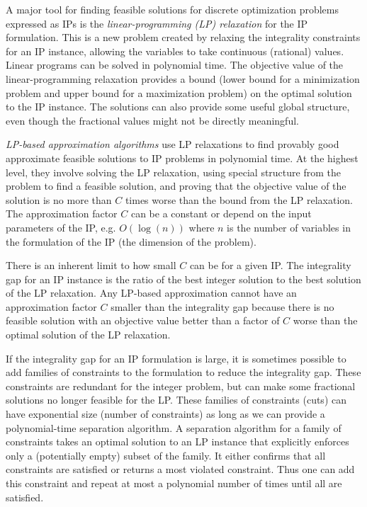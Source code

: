 \iffalse
However, there is substantial research into finding a feasible, provably-good approximate, and even (computationally) provably optimal solutions to specific IP instances. 
There is substantial research into finding a feasible, provably-good approximate solution for TODO, and even (computationally) provably optimal solutions to specific IP instances. \cindy{TODO: probably need to informally distinguish between a IP for a general problem, and a specific instance when the parameters are set.}
\fi

A major tool for finding feasible solutions for discrete optimization problems expressed as IPs is the {\em linear-programming (LP) relaxation} for the IP formulation. This is a new problem created by relaxing the integrality constraints for an IP instance, allowing the variables to take continuous (rational) values. Linear programs can be solved in polynomial time. The objective value of the linear-programming relaxation provides a bound (lower bound for a minimization problem and upper bound for a maximization problem) on the optimal solution to the IP instance. The solutions can also provide some useful global structure, even though the fractional values might not be directly meaningful. 

{\em LP-based approximation algorithms} use LP relaxations to find provably good approximate feasible solutions to IP problems in polynomial time. At the highest level, they involve solving the LP relaxation, using special structure from the problem to find a feasible solution, and proving that the objective value of the solution is no more than $C$ times worse than the bound from the LP relaxation. The approximation factor $C$ can be a constant or depend on the input parameters of the IP, e.g. $O(\log(n))$ where $n$ is the number of variables in the formulation of the IP (the dimension of the problem).

There is an inherent limit to how small $C$ can be for a given IP. The integrality gap for an IP instance is the ratio of the best integer solution to the best solution of the LP relaxation. Any LP-based approximation cannot have an approximation factor $C$ smaller than the integrality gap because there is no feasible solution with an objective value better than a factor of $C$ worse than the optimal solution of the LP relaxation. 

If the integrality gap for an IP formulation is large, it is sometimes possible to add families of constraints to the formulation to reduce the integrality gap.  These constraints are redundant for the integer problem, but can make some fractional solutions no longer feasible for the LP. These families of constraints (cuts) can have exponential size (number of constraints) as long as we can provide a polynomial-time separation algorithm. A separation algorithm for a family of constraints takes an optimal solution to an LP instance that explicitly enforces only a (potentially empty) subset of the family. It either confirms that all constraints are satisfied or returns a most violated constraint. Thus one can add this constraint and repeat at most a polynomial number of times until all are satisfied.


